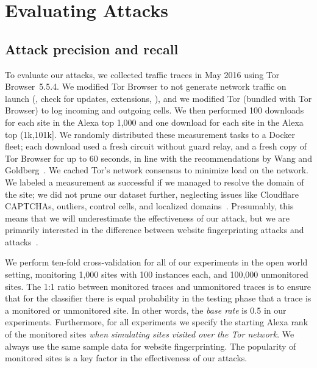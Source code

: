 \section{Evaluating \name Attacks}
\label{sec:analysis}

\subsection{Attack precision and recall}

To evaluate our \name attacks, we collected traffic traces in May
2016 using Tor Browser~5.5.4.
We modified Tor Browser to not generate network traffic on launch
(\ie, check for
updates, extensions, \etc), and we modified
Tor (bundled with Tor Browser) to log incoming and outgoing cells.
We then performed 100 downloads for each site in the Alexa top
1,000 and one download for each site in the
Alexa top (1k,101k]. We randomly distributed these measurement tasks
to a Docker fleet; each download used a fresh circuit without
guard relay, and a fresh copy of Tor Browser for up to 60 seconds,
in line with the recommendations by Wang and Goldberg~\cite[\S~4]{Wang2013a}.
We cached Tor's network consensus to minimize load on the
network.  We labeled a measurement as successful if we managed to
resolve the domain of the site; we did not prune our dataset further, neglecting
issues like Cloudflare CAPTCHAs, outliers, control cells, and localized
domains~\cite{Juarez2014a}.  Presumably, this means that we will underestimate
the effectiveness of our attack, but we are primarily interested in the
difference between website fingerprinting attacks and \name
attacks~\cite{Wang2013a}.

We perform ten-fold cross-validation for all of our experiments in the open
world setting, monitoring 1,000 sites with 100 instances each, and
100,000 unmonitored sites.
The 1:1 ratio between monitored traces and unmonitored traces is to
ensure that for the classifier there is equal probability in the testing
phase that a trace is a monitored or unmonitored site.
In other words, the \emph{base rate} is 0.5 in our experiments.
Furthermore, for all experiments we specify the starting Alexa rank of the
monitored sites
\emph{when simulating sites visited over the Tor network}.
We always use the same sample data for website fingerprinting.
The popularity of monitored sites
is a key factor in the effectiveness of our attacks.

